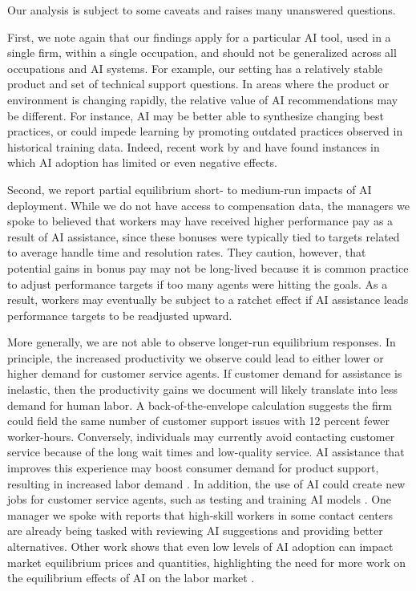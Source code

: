 \documentclass[11pt]{article}
\begin{document}
Our analysis is subject to some caveats and raises many unanswered questions.

First, we note again that our findings apply for a particular AI tool, used in a single firm, within a single occupation, and should not be generalized across all occupations and AI systems.  For example, our setting has a relatively stable product and set of technical support questions. In areas where the product or environment is changing rapidly, the relative value of AI recommendations may be different. For instance, AI may be better able to synthesize changing best practices, or could impede learning by promoting outdated practices observed in historical training data.  Indeed, recent work  by \citet{Perry2022DoUW} and \citet{otisUnevenImpactGenerative2023} have found instances in which AI adoption has limited or even negative effects.  

Second, we report partial equilibrium short- to medium-run impacts of AI deployment.  While we do not have access to compensation data, the managers we spoke to believed that workers may have received higher performance pay as a result of AI assistance, since these bonuses were typically tied to targets related to average handle time and resolution rates. They caution, however, that potential gains in bonus pay may not be long-lived because it is common practice to adjust performance targets if too many agents were hitting the goals.  As a result, workers may eventually be subject to a ratchet effect if AI assistance leads performance targets to be readjusted upward.  

More generally, we are not able to observe longer-run equilibrium responses.  In principle, the increased productivity we observe could lead to either lower or higher demand for customer service agents. If customer demand for assistance is inelastic, then the productivity gains we document will likely translate into less demand for human labor. A back-of-the-envelope calculation suggests the firm could field the same number of customer support issues with 12 percent fewer worker-hours.  Conversely, individuals may currently avoid contacting customer service because of the long wait times and low-quality service.  AI assistance that improves this experience may boost consumer demand for product support, resulting in increased labor demand \citep{berg2018, korinekantonHowInnovationAffects2023}.  In addition, the use of AI could create new jobs for customer service agents, such as testing and training AI models \citep{autornewwork2022}. One manager we spoke with reports that high-skill workers in some contact centers are already being tasked with reviewing AI suggestions and providing better alternatives.  Other work shows that even low levels of AI adoption can impact market equilibrium prices and quantities, highlighting the need for more work on the equilibrium effects of AI on the labor market \citep{raymondjmp}.
\end{document}
